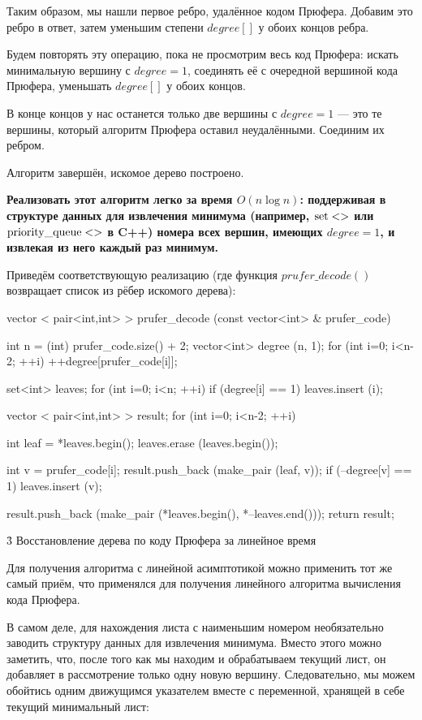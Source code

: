 Таким образом, мы нашли первое ребро, удалённое кодом Прюфера. Добавим это ребро в ответ, затем уменьшим степени $degree[]$ у обоих концов ребра.

Будем повторять эту операцию, пока не просмотрим весь код Прюфера: искать минимальную вершину с $degree = 1$, соединять её с очередной вершиной кода Прюфера, уменьшать $degree[]$ у обоих концов.

В конце концов у нас останется только две вершины с $degree = 1$ --- это те вершины, который алгоритм Прюфера оставил неудалёнными. Соединим их ребром.

Алгоритм завершён, искомое дерево построено.

\bf{Реализовать} этот алгоритм легко за время $O (n \log n)$: поддерживая в структуре данных для извлечения минимума (например, $\rm set<>$ или $\rm priority\_queue<>$ в C++) номера всех вершин, имеющих $degree=1$, и извлекая из него каждый раз минимум.

Приведём соответствующую реализацию (где функция $prufer\_decode()$ возвращает список из рёбер искомого дерева):

\code
vector < pair<int,int> > prufer_decode (const vector<int> & prufer_code) {
	int n = (int) prufer_code.size() + 2;
	vector<int> degree (n, 1);
	for (int i=0; i<n-2; ++i)
		++degree[prufer_code[i]];

	set<int> leaves;
	for (int i=0; i<n; ++i)
		if (degree[i] == 1)
			leaves.insert (i);

	vector < pair<int,int> > result;
	for (int i=0; i<n-2; ++i) {
		int leaf = *leaves.begin();
		leaves.erase (leaves.begin());

		int v = prufer_code[i];
		result.push_back (make_pair (leaf, v));
		if (--degree[v] == 1)
			leaves.insert (v);
	}
	result.push_back (make_pair (*leaves.begin(), *--leaves.end()));
	return result;
}
\endcode


\h3{ Восстановление дерева по коду Прюфера за линейное время }

Для получения алгоритма с линейной асимптотикой можно применить тот же самый приём, что применялся для получения линейного алгоритма вычисления кода Прюфера.

В самом деле, для нахождения листа с наименьшим номером необязательно заводить структуру данных для извлечения минимума. Вместо этого можно заметить, что, после того как мы находим и обрабатываем текущий лист, он добавляет в рассмотрение только одну новую вершину. Следовательно, мы можем обойтись одним движущимся указателем вместе с переменной, хранящей в себе текущий минимальный лист:

